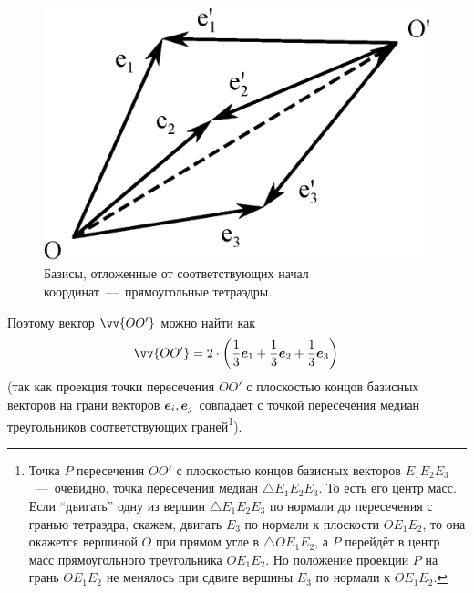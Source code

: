 \documentclass[a4paper,12pt]{article}
\begin{document}
\begin{solution}
    \begin{figure}[h]
      \centering
    
      \includegraphics[width=0.5\columnwidth]{many-vectors-kisses}
    
      \caption{Базисы, отложенные от соответствующих начал координат~---~прямоугольные тетраэдры.}
      \label{fig:many-vectors-kisses}
    \end{figure}
    
    Поэтому вектор $\vv{OO'}$ можно найти как
    \[
      \vv{OO'} = 2 \cdot \left(\frac{1}{3} \bds e_1 + \frac{1}{3} \bds e_2 + \frac{1}{3} \bds e_3\right)
    \]
    (так как проекция точки пересечения $OO'$ с плоскостью концов базисных векторов на грани векторов $\boldsymbol e_i, \boldsymbol e_j$ совпадает с точкой пересечения медиан треугольников соответствующих граней\footnote{Точка $P$ пересечения $OO'$ с плоскостью концов базисных векторов $E_1 E_2 E_3$~---~очевидно, точка пересечения медиан $\triangle E_1 E_2 E_3$. То есть его центр масс. Если ``двигать'' одну из вершин $\triangle E_1 E_2 E_3$ по нормали до пересечения с гранью тетраэдра, скажем, двигать $E_3$ по нормали к плоскости $O E_1 E_2$, то она окажется вершиной $O$ при прямом угле в $\triangle O E_1 E_2$, а $P$ перейдёт в центр масс прямоугольного треугольника $O E_1 E_2$. Но положение проекции $P$ на грань $O E_1 E_2$ не менялось при сдвиге вершины $E_3$ по нормали к $O E_1 E_2$.}).
    

\end{solution}
\end{document}
